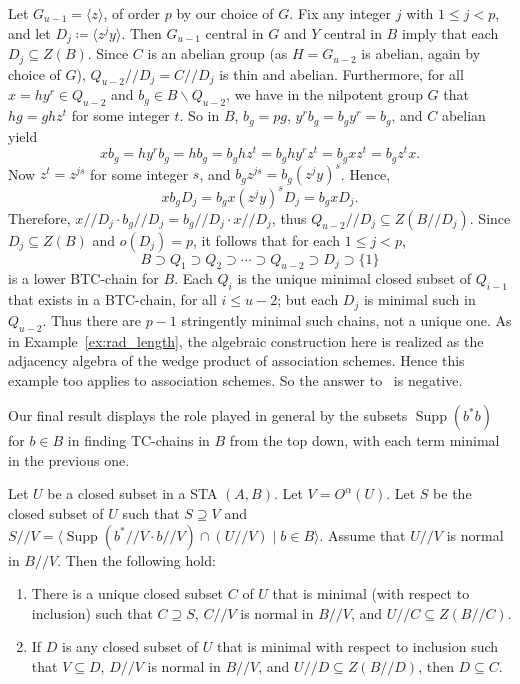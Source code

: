 \documentclass[ALCO,ThmDefs,Unicode,epreuves]{cedram}
\DeclareMathOperator{\Supp}{Supp}
\begin{document}
\begin{exam}
Let $G_{u-1} = \langle z \rangle$, of order $p$ by our choice of $G$.
Fix any integer $j$ with $1 \leq j < p$, and let $D_j \coloneqq \langle z^jy
\rangle$. Then $G_{u-1}$ central in $G$ and $Y$ central in $B$ imply
that each $D_j \subseteq Z(B)$. Since $C$ is an abelian group (as $H = G_{u-2}$ is abelian,
again by choice of $G$), $Q_{u-2}//D_j = C//D_j$ is thin and abelian.
Furthermore, for all $x = hy^r \in Q_{u-2}$ and $b_g \in B\backslash
Q_{u-2}$, we have in the nilpotent group $G$ that $hg = ghz^t$ for some
integer $t$. So in $B$, $b_g = pg$, $y^rb_g = b_gy^r = b_g$, and $C$
abelian yield
\[
xb_g = hy^rb_g = hb_g = b_ghz^t = b_ghy^rz^t = b_gxz^t = b_gz^tx.
\]
Now $z^t = z^{js}$ for some integer $s$, and $b_gz^{js} = b_g(z^jy)^s$.
Hence,
\[
xb_gD_j = b_gx(z^jy)^sD_j = b_gxD_j.
\]
Therefore, $x//D_j\cdot b_g//D_j = b_g//D_j\cdot x//D_j$, thus
$Q_{u-2}//D_j \subseteq Z(B//D_j)$. Since $D_j \subseteq Z(B)$ and
$o(D_j) = p$, it follows that for each $1 \leq j < p$, 
\[
B \supset Q_1 \supset Q_2 \supset \cdots \supset Q_{u-2} \supset D_j
\supset \{1\}
\]
is a lower BTC-chain for $B$. Each $Q_i$ is the unique minimal closed
subset of $Q_{i-1}$ that exists in a BTC-chain, for all $i \leq u-2$;
but each $D_j$ is minimal such in $Q_{u-2}$. Thus there are $p-1$
stringently minimal such chains, not a unique one. 
As in Example~\ref{ex:rad_length}, the
algebraic construction here is realized as the adjacency algebra of the wedge product of
association schemes. Hence this example too applies to association
schemes. 
 So the answer to~\cite [Question~2.11]{H} is negative.
\end{exam}


Our final result displays the role played in general by the subsets
$\Supp(b^*b)$ for $b \in B$ in finding TC-chains in $B$ from the
top down, with each term minimal in the previous one.

\begin{thm}
\label{thm:minimal}
Let $U$ be a closed subset in a STA $(A, B)$. Let $V =
O^{\alpha}(U)$. Let $S$ be the closed subset of $U$ such that $S
\supseteq V$ and $S//V = \langle \Supp(b^*//V\cdot b//V)\cap
(U//V)
 \mid b \in B\rangle $. Assume that $U//V$ is normal in $B//V$. Then the following hold:
\begin{enumerate}[label = \textup{(}\roman*\textup{)}] 
\item There is a unique closed subset $C$ of $U$ that
is minimal \textup{(}with respect to inclusion\textup{)} such that $C \supseteq S$, $C//V$
is normal in $B//V$,
 and $U//C \subseteq Z(B//C)$.
\item If $D$ is any closed subset of $U$ that is minimal with respect to
inclusion such that $V \subseteq D$, $D//V$
is normal in $B//V$, and $U//D \subseteq Z(B//D)$, then 
$D \subseteq C$.
\end{enumerate}
\end{thm}
\end{document}
